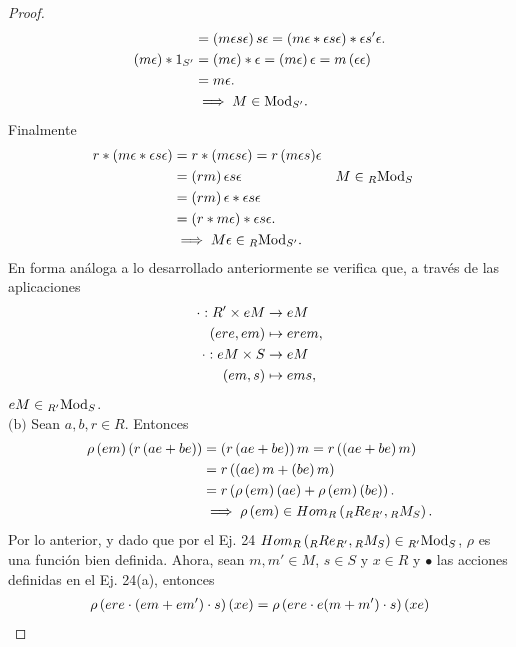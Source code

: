 \documentclass{article}
\begin{document}
\begin{enumerate}[label=\textbf{Ej \arabic*.}]
\begin{proof}
\begin{align*}
				&=\lrprth{m\epsilon s\epsilon}s\epsilon=\lrprth{m\epsilon*\epsilon s\epsilon}*\epsilon s'\epsilon.\\
				\lrprth{m\epsilon}*1_{S'}&=\lrprth{m\epsilon}*\epsilon=\lrprth{m\epsilon}\epsilon=m\lrprth{\epsilon\epsilon}\\&=m\epsilon.\\
				&\implies M\in\ringmod{S'}{\text{Mod}}{r}.\\		
			\end{align*}
			Finalmente
			\begin{align*}
				{r*\lrprth{{m\epsilon}*{\epsilon s\epsilon}}}&=r*\lrprth{{m\epsilon s}\epsilon}={r\lrprth{m\epsilon s}}\epsilon\\
				&={\lrprth{rm}\epsilon s}\epsilon && M\in\ringbimod{R}{S}{\text{Mod}}{lr}\\
				&={\lrprth{rm}\epsilon}*{\epsilon s\epsilon}\\
				&=\lrprth{r*{m\epsilon}}*{\epsilon s\epsilon}.\\
				&\implies M\epsilon\in\ringbimod{R}{S'}{\text{Mod}}{lr}.
			\end{align*}
			En forma análoga a lo desarrollado anteriormente se verifica que, a través de las aplicaciones
			\begin{align*}
				\cdot: R'\times eM &\rightarrow eM\\ (ere,em) &\mapsto e{rem},\\
				\cdot: eM\times S &\rightarrow eM\\ (em,s) &\mapsto e{ms},
			\end{align*}
			$eM\in\ringbimod{R'}{S}{\text{Mod}}{lr}$.\\
			$\boxed{\text{(b)}}$ Sean $a,b,r\in R$. Entonces
			\begin{align*}
				{\rho\lrprth{em}}\lrprth{r\lrprth{ae+be}}&=\lrprth{r\lrprth{ae+be}}m=r\lrprth{\lrprth{ae+be}m}\\
				&=r\lrprth{\lrprth{ae}m+\lrprth{be}m}\\
				&=r\lrprth{\rho\lrprth{em}(ae)+\rho\lrprth{em}(be)}.\\
				&\implies \rho\lrprth{em}\in\ringmodhom{R}{\ringbimod{R}{R'}{Re}{lr}}{\ringbimod{R}{S}{M}{lr}}.
			\end{align*}
			Por lo anterior, y dado que por el Ej. 24  $\ringmodhom{R}{\ringbimod{R}{R'}{Re}{lr}}{\ringbimod{R}{S}{M}{lr}}\in\ringbimod{R'}{S}{\text{Mod}}{lr}$, $\rho$ es una función bien definida. Ahora, sean $m,m'\in M$, $s\in S$ y $x\in R$ y $\bullet$ las acciones definidas en el Ej. 24(a), entonces 
			\begin{align*}
				\rho\lrprth{ere\cdot\lrprth{em+em'}\cdot s}\lrprth{xe}&=\rho\lrprth{{ere}\cdot{e{\lrprth{m+m'}}\cdot s}}(xe)\\

\end{align*}
\end{proof}
\end{enumerate}
\end{document}
